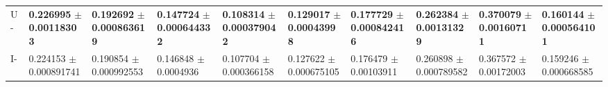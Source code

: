 \begin{table*}[!htb]
{\begin{tabular}{l|llll|llll|l}
		U-\LinearLow & \textbf{\num{0.226995}} $\pm$ \textbf{\num{0.00118303} }& \textbf{\num{0.192692}} $\pm$ \textbf{\num{0.000863619}} & \textbf{\num{0.147724}} $\pm$ \textbf{\num{0.000644332}} & \textbf{\num{0.108314}} $\pm$ \textbf{\num{0.000379042}} & \textbf{\num{0.129017}} $\pm$ \textbf{\num{0.00043998} }& \textbf{\num{0.177729}} $\pm$ \textbf{\num{0.000842416}} & \textbf{\num{0.262384}} $\pm$ \textbf{\num{0.00131329} }& \textbf{\num{0.370079}} $\pm$ \textbf{\num{0.00160711} }& \textbf{\num{0.160144}} $\pm$ \textbf{\num{0.000564101}}\\

		I-\LinearLow&\num{0.224153} $\pm$ \num{0.000891741}&\num{0.190854} $\pm$ \num{0.000992553}&\num{0.146848} $\pm$ \num{0.0004936}&\num{0.107704} $\pm$ \num{0.000366158}&\num{0.127622} $\pm$ \num{0.000675105}&\num{0.176479} $\pm$ \num{0.00103911}&\num{0.260898} $\pm$ \num{0.000789582}&\num{0.367572} $\pm$ \num{0.00172003}&\num{0.159246} $\pm$ \num{0.000668585}\\
		\hline
	\end{tabular}
}
\end{table*}
